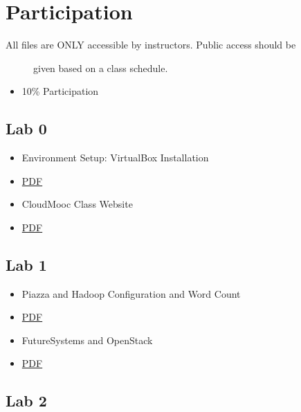 \FILENAME

\section{Participation}\label{participation}

\begin{description}
\item[All files are ONLY accessible by instructors. Public access should
be]
given based on a class schedule.
\end{description}

\begin{itemize}

\item
  10\% Participation
\end{itemize}

\subsection{Lab 0}\label{lab-0}

\begin{itemize}

\item
  Environment Setup: VirtualBox Installation
\item
  \href{https://drive.google.com/open?id=0B88HKpainTSfRFgwX0IxaWM5TFE}{PDF}
\item
  CloudMooc Class Website
\item
  \href{https://drive.google.com/open?id=0B88HKpainTSfS3hNb2tVSW9GcE0}{PDF}
\end{itemize}

\subsection{Lab 1}\label{lab-1}

\begin{itemize}

\item
  Piazza and Hadoop Configuration and Word Count
\item
  \href{https://drive.google.com/open?id=0B88HKpainTSfMzVSa1pYM0tfMzg}{PDF}
\item
  FutureSystems and OpenStack
\item
  \href{https://drive.google.com/open?id=0B88HKpainTSfNEhmeHBveXRSSUk}{PDF}
\end{itemize}

\subsection{Lab 2}\label{lab-2}

